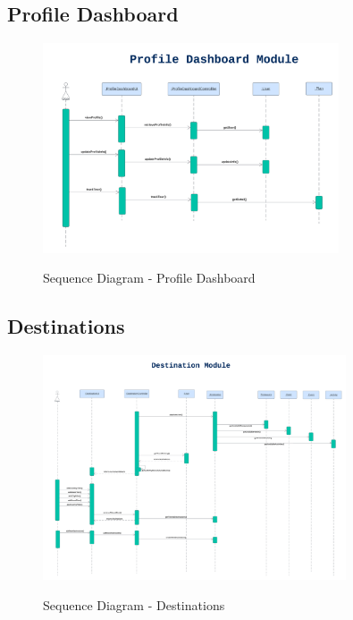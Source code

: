 \documentclass[12pt]{article}
\begin{document}
\subsection{Profile Dashboard}
\begin{figure}[H]
    \centering
        \includegraphics[width=0.78\textwidth]{Sequence Diagram/ProfileDashboard.png}
        \label{fig:SeqProfile}
    \caption{Sequence Diagram - Profile Dashboard}
\end{figure}

\newpage
\subsection{Destinations}
\begin{figure}[H]
    \centering
        \includegraphics[width=0.80\textwidth]{Sequence Diagram/Destination.png}
        \label{fig:SeqDest}
    \caption{Sequence Diagram - Destinations}
\end{figure}
\end{document}
